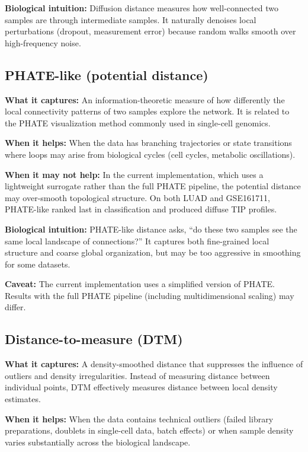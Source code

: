 \documentclass[11pt]{article}
\begin{document}
\textbf{Biological intuition:} Diffusion distance measures how well-connected two samples are through intermediate samples.
It naturally denoises local perturbations (dropout, measurement error) because random walks smooth over high-frequency noise.

\subsection{PHATE-like (potential distance)}

\textbf{What it captures:} An information-theoretic measure of how differently the local connectivity patterns of two samples explore the network.
It is related to the PHATE visualization method commonly used in single-cell genomics.

\textbf{When it helps:} When the data has branching trajectories or state transitions where loops may arise from biological cycles (cell cycles, metabolic oscillations).

\textbf{When it may not help:} In the current implementation, which uses a lightweight surrogate rather than the full PHATE pipeline, the potential distance may over-smooth topological structure.
On both LUAD and GSE161711, PHATE-like ranked last in classification and produced diffuse TIP profiles.

\textbf{Biological intuition:} PHATE-like distance asks, ``do these two samples see the same local landscape of connections?''
It captures both fine-grained local structure and coarse global organization, but may be too aggressive in smoothing for some datasets.

\textbf{Caveat:} The current implementation uses a simplified version of PHATE.
Results with the full PHATE pipeline (including multidimensional scaling) may differ.

\subsection{Distance-to-measure (DTM)}

\textbf{What it captures:} A density-smoothed distance that suppresses the influence of outliers and density irregularities.
Instead of measuring distance between individual points, DTM effectively measures distance between local density estimates.

\textbf{When it helps:} When the data contains technical outliers (failed library preparations, doublets in single-cell data, batch effects) or when sample density varies substantially across the biological landscape.
\end{document}
